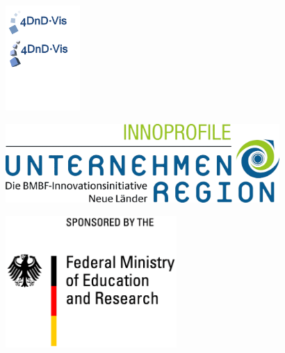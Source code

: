 {\begin{minipage}{11.89cm}
\begin{flushright}
		\end{flushright}
	\end{minipage}
	\begin{minipage}{11.3cm}
		\begin{flushright}
			\includegraphics[height=4cm]{./resources/4DnD-Logo.pdf}
		\end{flushright}
	\end{minipage}
	\begin{minipage}{13.67cm}
		\begin{flushright}
			\includegraphics[height=3cm]{./resources/inno-profile.png}
		\end{flushright}
	\end{minipage}
	\begin{minipage}{9.51cm}
		\begin{flushright}
			\includegraphics[height=5cm]{./resources/Logo-BMBF-EN.png}
		\end{flushright}
	\end{minipage}
}


